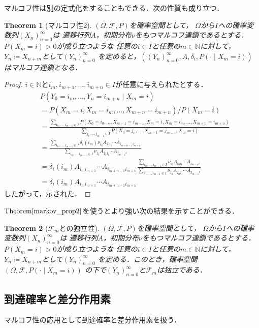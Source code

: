 \documentclass[dvipdfmx,autodetect-engine]{jsarticle}
\newtheorem{theorem}{Theorem}[section]
\theoremstyle{remark}
\theoremstyle{definition}
\newcommand{\N}{\mathbb{N}}
\begin{document}
マルコフ性は別の定式化をすることもできる．次の性質も成り立つ．
\begin{theorem}[マルコフ性2]\label{markov_prop2}
    $(\Omega,\mathcal{F},P)$を確率空間として，
    $\Omega$から$I$への確率変数列$(X_n)_{n=0}^{\infty}$は
    遷移行列$A$，初期分布$\nu$をもつマルコフ連鎖であるとする．
    $P(X_m = i) >0$が成り立つような
    任意の$i \in I$と任意の$m \in \N$に対して，
    $Y_n \coloneqq X_{n+m}$として$(Y_n)_{n=0}^{\infty}$
    を定めると，$((Y_n)_{n=0}^{\infty},A,\delta_i, P(\cdot \mid X_m = i))$
    はマルコフ連鎖となる．
\end{theorem}

\begin{proof}
    $i \in \N$と$i_m,i_{m+1},\ldots,i_{m+n} \in I$が任意に与えられたとする．
    \begin{align}
        &P(Y_0 = i_m ,\ldots, Y_n = i_{m+n} \mid X_m = i) \\
        &= P(X_m = i,X_m = i_m,\ldots,X_{m+n}=i_{m+n}) / P(X_m = i) \\
        &= \frac{\sum_{i_0,\ldots,i_{m-1} \in I} P(X_0 = i_0,\ldots, 
        X_{m-1} = i_{m-1},X_m = i,X_m = i_m,\ldots,X_{m+n}=i_{m+n})}{\sum_{j_0,\ldots,j_{m-1} 
        \in I} P(X_0 = j_0,\ldots, X_{m-1} = j_{m-1},X_m = i)}\\
        &= \frac{\sum_{i_0,\ldots,i_{m-1} \in I} \delta_{i}(i_m) 
         \nu_{i_0} A_{i_0 i_1} \cdots A_{i_{m+n-1}{i_{m+n}}}}{\sum_{i_0,\ldots,i_{m-1} \in I} 
         \nu_{j_0} A_{j_0 j_1} \cdots A_{j_{m-1} i}} \\
        &= \delta_{i}(i_m) A_{i_{m} i_{m+1}} \cdots A_{i_{m+n-1} i_{m+n}} \frac{\sum_{i_0,\ldots,i_{m-1} \in I} 
        \nu_{i_0} A_{i_0 i_1} \cdots A_{i_{m-1} i}}{\sum_{i_0,\ldots,i_{m-1} \in I} 
        \nu_{j_0} A_{j_0 j_1} \cdots A_{j_{m-1} i}} \\
        &= \delta_{i}(i_m) A_{i_{m} i_{m+1}} \cdots A_{i_{m+n-1} i_{m+n}}
    \end{align}
    したがって，示された．
\end{proof}

$\mathrm{Theorem}\ref{markov_prop2}$を使うとより強い次の結果を示すことができる．
\begin{theorem}[$\mathcal{F}_{m}$との独立性]
    $(\Omega,\mathcal{F},P)$を確率空間として，
    $\Omega$から$I$への確率変数列$(X_n)_{n=0}^{\infty}$は
    遷移行列$A$，初期分布$\nu$をもつマルコフ連鎖であるとする．
    $P(X_m = i) >0$が成り立つような
    任意の$i \in I$と任意の$m \in \N$に対して，
    $Y_n \coloneqq X_{n+m}$として$(Y_n)_{n=0}^{\infty}$
    を定める．このとき，確率空間$(\Omega,\mathcal{F},P(\cdot \mid X_m = i))$
    の下で$(Y_n)_{n=0}^{\infty}$と$\mathcal{F}_m$は独立である．
\end{theorem}
\subsection{到達確率と差分作用素}
マルコフ性の応用として到達確率と差分作用素を扱う．
\end{document}
